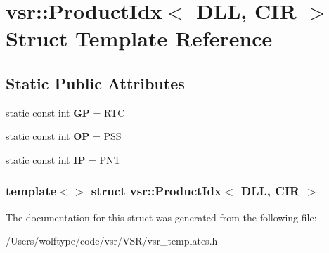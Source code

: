 \hypertarget{structvsr_1_1_product_idx_3_01_d_l_l_00_01_c_i_r_01_4}{\section{vsr\-:\-:Product\-Idx$<$ D\-L\-L, C\-I\-R $>$ Struct Template Reference}
\label{structvsr_1_1_product_idx_3_01_d_l_l_00_01_c_i_r_01_4}
}
\subsection*{Static Public Attributes}
\begin{DoxyCompactItemize}
\item 
\hypertarget{structvsr_1_1_product_idx_3_01_d_l_l_00_01_c_i_r_01_4_a9a9cb568794337a7683c96e7ce918a06}{static const int {\bfseries G\-P} = R\-T\-C}\label{structvsr_1_1_product_idx_3_01_d_l_l_00_01_c_i_r_01_4_a9a9cb568794337a7683c96e7ce918a06}

\item 
\hypertarget{structvsr_1_1_product_idx_3_01_d_l_l_00_01_c_i_r_01_4_ac8011a58d04a99e24dd8a898298c2588}{static const int {\bfseries O\-P} = P\-S\-S}\label{structvsr_1_1_product_idx_3_01_d_l_l_00_01_c_i_r_01_4_ac8011a58d04a99e24dd8a898298c2588}

\item 
\hypertarget{structvsr_1_1_product_idx_3_01_d_l_l_00_01_c_i_r_01_4_a2f9b2ec9f65bd70f05461fb1d27a17be}{static const int {\bfseries I\-P} = P\-N\-T}\label{structvsr_1_1_product_idx_3_01_d_l_l_00_01_c_i_r_01_4_a2f9b2ec9f65bd70f05461fb1d27a17be}

\end{DoxyCompactItemize}
\subsubsection*{template$<$$>$ struct vsr\-::\-Product\-Idx$<$ D\-L\-L, C\-I\-R $>$}



The documentation for this struct was generated from the following file\-:\begin{DoxyCompactItemize}
\item 
/\-Users/wolftype/code/vsr/\-V\-S\-R/vsr\-\_\-templates.\-h\end{DoxyCompactItemize}
